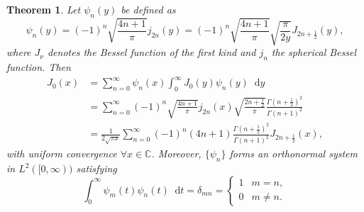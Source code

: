 \documentclass{article}
\theoremstyle{plain}
\newtheorem{theorem}{Theorem}
\newcommand{\d}{\mathop{}\!\mathrm{d}} %
\begin{document}
\begin{theorem}
  Let $\psi_n(y)$ be defined as
  \begin{equation}
    \psi_n(y) = (-1)^n \sqrt{\frac{4n + 1}{\pi}} j_{2n}(y)
              = (-1)^n \sqrt{\frac{4n + 1}{\pi}} \sqrt{\frac{\pi}{2y}} J_{2n + \frac{1}{2}}(y),
  \end{equation}
  where $J_\nu$ denotes the Bessel function of the first kind and $j_n$ the spherical Bessel function. Then
  \begin{equation}
    \begin{aligned}
      J_0(x) &= \sum_{n=0}^\infty \psi_n(x) \int_0^\infty J_0(y)\psi_n(y) \d y \\
             &= \sum_{n=0}^\infty (-1)^n \sqrt{\frac{4n + 1}{\pi}} j_{2n}(x)
                            \sqrt{\frac{2n + \frac{1}{2}}{\pi}} \frac{\Gamma(n + \frac{1}{2})^2}{\Gamma(n+1)^2} \\
             &= \frac{1}{2\sqrt{\pi x}} \sum_{n=0}^\infty (-1)^n (4n+1) \frac{\Gamma(n + \frac{1}{2})^2}{\Gamma(n+1)^2} J_{2n + \frac{1}{2}}(x),
    \end{aligned}
  \end{equation}
  with uniform convergence $\forall x \in \mathbb{C}$. Moreover, $\{\psi_n\}$ forms an orthonormal system in $L^2([0,\infty))$ satisfying
  \begin{equation}
    \int_0^\infty \psi_m(t)\psi_n(t) \d t = \delta_{mn} =
    \begin{cases}
      1 & m = n, \\
      0 & m \neq n.
    \end{cases}
  \end{equation}
\end{theorem}
\end{document}
